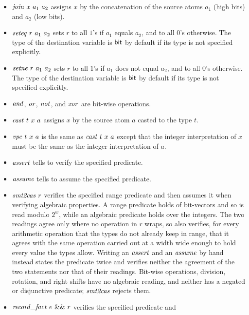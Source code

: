 \documentclass{article}
\begin{document}
\begin{itemize}
  puts all of $a$ in $x_h$ and leaves $x_l$ zero, or the size of $a$,
  which puts all of $a$ in $x_l$ and leaves $x_h$ zero.
  The latter needs an unsigned $x_h$: for a signed $a$ it would hold
  the sign of $a$ repeated, which no single instruction produces.
\item $\mathit{join}\ x\ a_1\ a_2$ assigns $x$ by the concatenation of the
  source atoms $a_1$ (high bits) and $a_2$ (low bits).
\item $\mathit{seteq}\ r\ a_1\ a_2$ sets $r$ to all $1$'s if $a_1$ equals
  $a_2$, and to all $0$'s otherwise.
  The type of the destination variable is $\mathsf{bit}$ by default if its
  type is not specified explicitly.
\item $\mathit{setne}\ r\ a_1\ a_2$ sets $r$ to all $1$'s if $a_1$ does not
  equal $a_2$, and to all $0$'s otherwise.
  The type of the destination variable is $\mathsf{bit}$ by default if its
  type is not specified explicitly.
\item $\mathit{and}$, $\mathit{or}$, $\mathit{not}$, and $\mathit{xor}$ are bit-wise operations.
\item $\mathit{cast}\ t\ x\ a$ assigns $x$ by the source atom $a$ casted to the
  type $t$.
\item $\mathit{vpc}\ t\ x\ a$ is the same as $\mathit{cast}\ t\ x\ a$ except that
  the integer interpretation of $x$ must be the same as the integer
  interpretation of $a$.
\item $\mathit{assert}$ tells \cryptoline to verify the specified predicate.
\item $\mathit{assume}$ tells \cryptoline to assume the specified predicate.
\item $\mathit{smt2cas}\ r$ verifies the specified range predicate and then
  assumes it when verifying algebraic properties.
  A range predicate holds of bit-vectors and so is read modulo $2^w$,
  while an algebraic predicate holds over the integers.
  The two readings agree only where no operation in $r$ wraps, so
  \cryptoline also verifies, for every arithmetic operation that the
  types do not already keep in range, that it agrees with the same
  operation carried out at a width wide enough to hold every value the
  types allow.
  Writing an $\mathit{assert}$ and an $\mathit{assume}$ by hand instead states the
  predicate twice and verifies neither the agreement of the two
  statements nor that of their readings.
  Bit-wise operations, division, rotation, and right shifts have no
  algebraic reading, and neither has a negated or disjunctive
  predicate; $\mathit{smt2cas}$ rejects them.
\item $\mathit{record\_fact}\ e\ \&\&\ r$ verifies the specified predicate and

\end{itemize}
\end{document}
